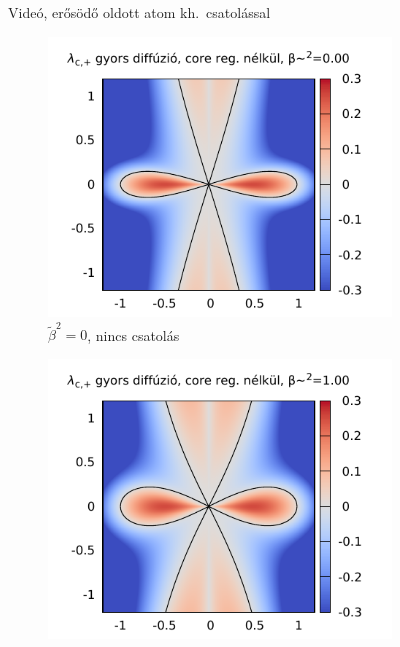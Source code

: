 \documentclass[10pt,a4paper]{scrartcl}
\begin{document}
\begin{figure}[htb]
\centering
{}
\caption{Videó, erősödő oldott atom kh.\ csatolással}
\end{figure}

\begin{figure}[htb]
\centering
\begin{subfigure}[t]{0.495\linewidth}
\centering\includegraphics[scale=0.95]{"figs/lambda_c_k_surface_btsq=0"}
\caption{$\tilde \beta^2=0$, nincs csatolás}
\end{subfigure}
\begin{subfigure}[t]{0.495\linewidth}
\centering\includegraphics[scale=0.95]{"figs/lambda_c_k_surface_btsq=1"}

\end{subfigure}
\end{figure}
\end{document}
